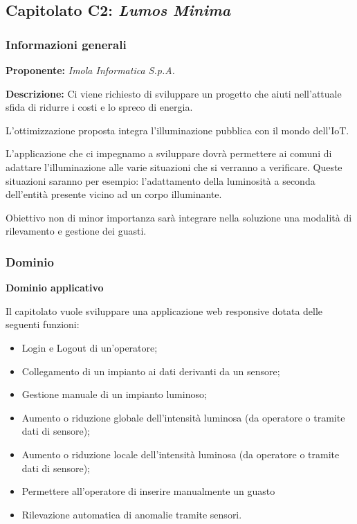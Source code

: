 \subsection{Capitolato C2: \textit{Lumos Minima}}
\subsubsection{Informazioni generali}
\textbf{Proponente:} \textit{Imola Informatica S.p.A.}

\textbf{Descrizione:} Ci viene richiesto di sviluppare un progetto che aiuti nell'attuale sfida di ridurre i costi e lo spreco di energia.

L'ottimizzazione proposta integra l'illuminazione pubblica con il mondo dell'IoT.

L'applicazione che ci impegnamo a sviluppare dovrà permettere ai comuni di adattare l'illuminazione alle varie situazioni che si verranno a verificare. Queste situazioni saranno per esempio: l'adattamento della luminosità a seconda dell'entità presente vicino ad un corpo illuminante.

Obiettivo non di minor importanza sarà integrare nella soluzione una modalità di rilevamento e gestione dei guasti. 

\subsubsection{Dominio}

\textbf{Dominio applicativo}

Il capitolato vuole sviluppare una applicazione web responsive dotata delle seguenti funzioni:
\begin{itemize}
    \item Login e Logout di un'operatore;
    \item Collegamento di un impianto ai dati derivanti da un sensore;
    \item Gestione manuale di un impianto luminoso;
    \item Aumento o riduzione globale dell'intensità luminosa (da operatore o tramite dati di sensore);
    \item Aumento o riduzione locale dell'intensità luminosa (da operatore o tramite dati di sensore);
    \item Permettere all'operatore di inserire manualmente un guasto
    \item Rilevazione automatica di anomalie tramite sensori.
\end{itemize}

